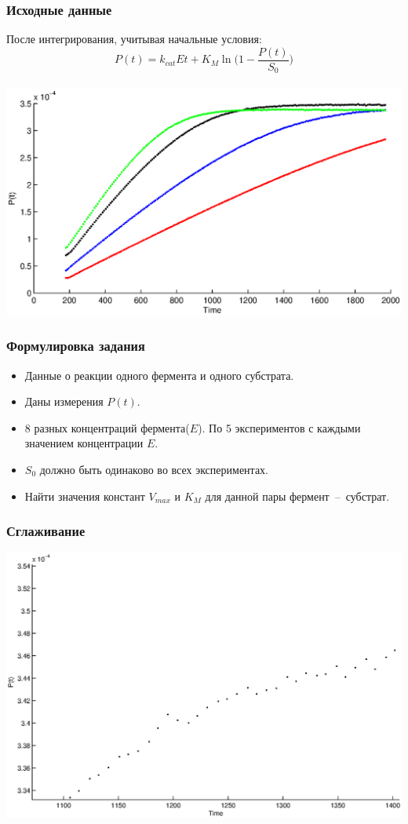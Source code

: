 \documentclass[smaller]{beamer}
\begin{document}
\begin{frame}
  \frametitle{Исходные данные}
  После интегрирования, учитывая начальные условия:
  $$P(t)=k_{cat}Et+K_{M}\ln\biggl( 1-\frac{P(t)}{S_0}\biggr)$$
  \\ \includegraphics[scale=0.5]{Pt_raw.eps}
\end{frame}

\begin{frame}
  \frametitle{Формулировка задания}
    \begin{itemize}
   \item Данные о реакции одного фермента и одного субстрата.
   \item Даны измерения $P(t)$.
   \item 8 разных концентраций фермента($E$). По 5 экспериментов с каждыми значением концентрации $E$.
   \item $S_0$ должно быть одинаково во всех экспериментах.
   \item Найти значения констант $V_{max}$ и $K_M$ для данной пары фермент~--~субстрат.
   \end{itemize}
\end{frame}

\begin{frame}
  \frametitle{Сглаживание}
   \includegraphics[scale=0.5]{Pt_fuzzy.eps}
\end{frame}
\end{document}
